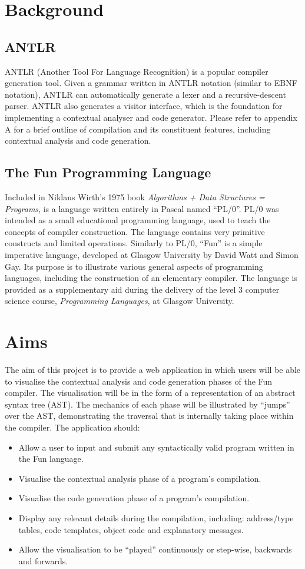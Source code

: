 \documentclass{l4proj}
\begin{document}
\section{Background}
\subsection{ANTLR}
ANTLR (Another Tool For Language Recognition) is a popular compiler generation tool. Given a grammar written in ANTLR notation (similar to EBNF notation), ANTLR can automatically generate a lexer and a recursive-descent parser. ANTLR also generates a visitor interface, which is the foundation for implementing a contextual analyser and code generator. Please refer to appendix A for a brief outline of compilation and its constituent features, including contextual analysis and code generation.

\subsection{The Fun Programming Language}
Included in Niklaus Wirth's 1975 book {\it Algorithms + Data Structures = Programs}, is a language written entirely in Pascal named ``PL/0''. PL/0 was intended as a small educational programming language, used to teach the concepts of compiler construction. The language contains very primitive constructs and limited operations. Similarly to PL/0, ``Fun'' is a simple imperative language, developed at Glasgow University by David Watt and Simon Gay. Its purpose is to illustrate various general aspects of programming languages, including the construction of an elementary compiler. The language is provided as a supplementary aid during the delivery of the level 3 computer science course, {\it Programming Languages}, at Glasgow University.

\section{Aims}
The aim of this project is to provide a web application in which users will be able to visualise the contextual analysis and code generation phases of the Fun compiler. The visualisation will be in the form of a representation of an abstract syntax tree (AST). The mechanics of each phase will be illustrated by ``jumps'' over the AST, demonstrating the traversal that is internally taking place within the compiler. The application should:
\begin{itemize}
\item Allow a user to input and submit any syntactically valid program written in the Fun language.
\item Visualise the contextual analysis phase of a program's compilation. 
\item Visualise the code generation phase of a program's compilation.
\item Display any relevant details during the compilation, including: address/type tables, code templates, object code and explanatory messages.
\item Allow the visualisation to be ``played'' continuously or step-wise, backwards and forwards.
\end{itemize}
\end{document}
